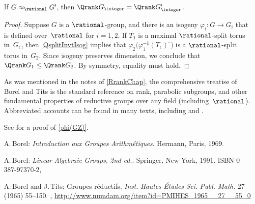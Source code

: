 \begin{cor} \label{Qrank(isog)=}
 If $G \approx_\rational G'$, then $\Qrank G_\integer = \Qrank G'_\integer$.
 \end{cor} 

\begin{proof}
Suppose $G$ is a $\rational$-group, and there is an isogeny $\varphi_i \colon G \to G_i$ that is defined over~$\rational$ for $i = 1,2$.
If $T_1$ is a maximal $\rational$-split torus in~$G_1$, then \cref{QsplitInvtIsog} implies that $\varphi_2 \bigl( \varphi_1^{-1}(T_1)^\circ \bigr)$ is a $\rational$-split torus in~$G_2$. Since isogeny preserves dimension, we conclude that $\Qrank G_1 \le \Qrank G_2$. By symmetry, equality must hold.
\end{proof}

%
%



\begin{notes}

As was mentioned in the notes of \cref{RrankChap}, the comprehensive treatise of Borel and Tits \cite{BorelTits-GrpRed} is the standard reference on rank, parabolic subgroups, and other fundamental properties of reductive groups over any field (including~$\rational$).
Abbreviated accounts can be found in many texts, including \cite[\S10 and \S11]{Borel-IntroGrpArith} and  \cite[Chap.~5]{Borel-LinAlgGrps}.

See \cite[Rem.~8.11, p.~60]{Borel-IntroGrpArith} for a proof of \cref{phi(GZ)}.
	

\end{notes}

\begin{references}{9}


A.\,Borel:
\emph{Introduction aux Groupes Arithm\'etiques}.
Hermann, Paris, 1969.

A.\,Borel:
\emph{Linear Algebraic Groups, 2nd ed.}.
Springer, New York, 1991.
ISBN 0-387-97370-2,

A.\,Borel and J.\,Tits:
Groupes r\'eductifs,
\emph{Inst. Hautes \'Etudes Sci. Publ. Math.} 27 (1965) 55--150.
,
\maynewline
\url{http://www.numdam.org/item?id=PMIHES_1965__27__55_0}

\end{references}



